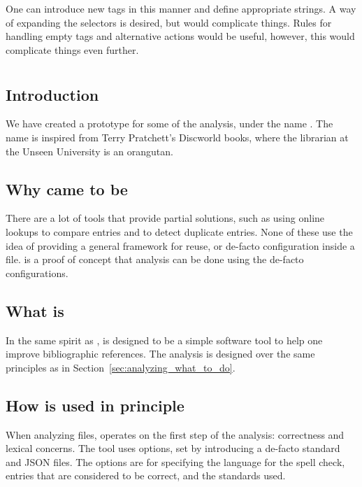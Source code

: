 One can introduce new tags in this manner and define appropriate
strings.  A way of expanding the selectors is desired, but would
complicate things.  Rules for handling empty tags and alternative
actions would be useful, however, this would complicate things even
further.


\section{{\orangutan}}
\label{sec:analyzing_orangutan}
\subsection{Introduction}

We have created a prototype for some of the analysis, under the name
\newdef{\orangutan}.  The name {\orangutan} is inspired from Terry
Pratchett's Discworld books, where the librarian at the Unseen
University is an orangutan.


\subsection{Why {\orangutan} came to be}

There are a lot of tools that provide partial solutions, such as using
online lookups to compare entries and to detect duplicate entries.
None of these use the idea of providing a general framework for reuse,
or de-facto configuration inside a {\bibtex} file.  {\orangutan} is a
proof of concept that analysis can be done using the de-facto
configurations.


\subsection{What is {\orangutan}}

In the same spirit as {\bibtex}, {\orangutan} is designed to be a
simple software tool to help one improve bibliographic references.
The analysis is designed over the same principles as in
Section~\ref{sec:analyzing_what_to_do}.


\subsection{How {\orangutan} is used in principle}

When analyzing {\bibtex} files, {\orangutan} operates on the first
step of the analysis: correctness and lexical concerns.  The tool uses
options, set by introducing a de-facto standard and JSON files.  The
options are for specifying the language for the spell check, entries
that are considered to be correct, and the standards used.


